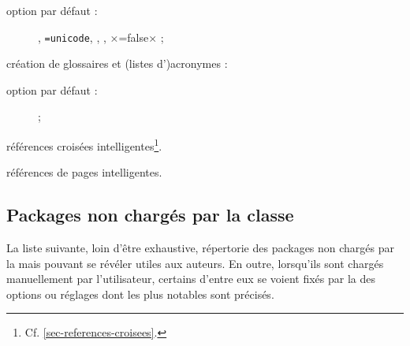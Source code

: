 \documentclass[french,nolocaltoc]{nwejmart}
\newtheorem[style=definition]{fait}
\newtheorem[title=contraventionnalisation]{ctrv}
\newtheorem[title-plural=anneaux]{anneau}
\newtheorem[title-plural=idéaux]{idéal}
\begin{document}
\begin{description}
  \begin{description}
  \item[option par défaut :] ,
    \lstinline[alsolanguage={[hyperref]TeX}]×=unicode×,
    , ,
    ×=false× ;
  \end{description}
\item[\package{glossaries} :] création de glossaires et (listes d')acronymes :
  \begin{description}
  \item[option par défaut :]  ;
  \end{description}
\item[\package{zref-clever} :] références croisées
  intelligentes\footnote{Cf. \vref{sec-references-croisees}.}.
\item[\package{zref-varioref} :] références de pages intelligentes.
\end{description}

\subsection{Packages non  chargés par la classe}\label{sec:packages-non-charges}

La liste suivante, loin d'être exhaustive, répertorie des packages non chargés
par la \nwejmauthorcl{} mais pouvant se révéler utiles aux auteurs.  En outre,
lorsqu'ils sont chargés manuellement par l'utilisateur, certains d'entre eux se
voient fixés par la \nwejmauthorcl{} des options ou réglages dont les plus
notables sont précisés.
\end{document}
